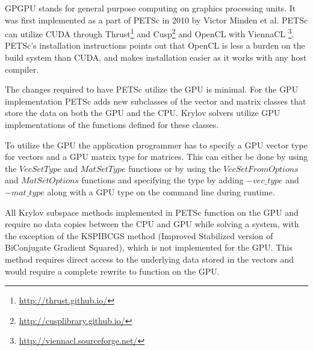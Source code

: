GPGPU stands for general purpose computing on graphics processing units. It was 
first implemented as a part of PETSc in 2010\cite{minden2010preliminary} by Victor 
Minden et al. PETSc can utilize CUDA through Thrust\footnote{\url{http://thrust.github.io/}} 
and Cusp\footnote{\url{http://cusplibrary.github.io/}} and OpenCL with ViennaCL
\footnote{\url{http://viennacl.sourceforge.net/}}. PETSc's installation instructions 
points out that OpenCL is less a burden on the build system than CUDA, and makes 
installation easier as it works with any host compiler. 

The changes required to have PETSc utilize the GPU is minimal. For the GPU 
implementation PETSc adds new subclasses of the vector and matrix classes that 
store the data on both the GPU and the CPU. Krylov solvers utilize GPU implementations 
of the functions defined for these classes.

To utilize the GPU the application programmer has to specify a GPU vector type 
for vectors and a GPU matrix type for matrices. This can either be done by using 
the $VecSetType$ and $MatSetType$ functions or by using the $VecSetFromOptions$ 
and $MatSetOptions$ functions and specifying the type by adding $-vec\_type$ and 
$-mat\_type$ along with a GPU type on the command line during runtime. 

All Krylov subspace methods implemented in PETSc function on the GPU and require 
no data copies between the CPU and GPU while solving a system, with the exception
of the KSPIBCGS method (Improved Stabilized version of BiConjugate Gradient Squared),
which is not implemented for the GPU. This method requires direct access to the 
underlying data stored in the vectors and would require a complete rewrite to 
function on the GPU.
